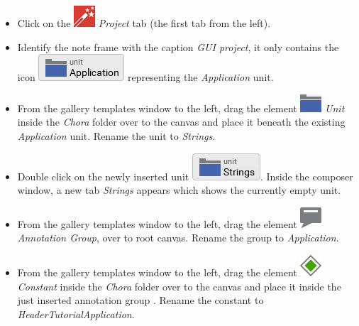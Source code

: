 \documentclass[
  a4paper,
,tablecaptionabove
]{scrbook}
\begin{document}
\begin{itemize}
\item
  Click on the
  \includegraphics{./../asciidoc/modules/ROOT/assets/images/icons/EmbeddedWizardIcon.png}
  \emph{Project} tab (the first tab from the left).
\item
  Identify the note frame with the caption \emph{GUI project}, it only
  contains the icon
  \includegraphics{./../asciidoc/modules/ROOT/assets/images/icons/ApplicationUnitIcon.png}
  representing the \emph{Application} unit.
\item
  From the gallery templates window to the left, drag the element
  \includegraphics{./../asciidoc/modules/ROOT/assets/images/icons/UnitIcon.png}
  \emph{Unit} inside the \emph{Chora} folder over to the canvas and
  place it beneath the existing \emph{Application} unit. Rename the unit
  to \emph{Strings}.
\item
  Double click on the newly inserted unit
  \includegraphics{./../asciidoc/modules/ROOT/assets/images/icons/StringsUnitIcon.png}.
  Inside the composer window, a new tab \emph{Strings} appears which
  shows the currently empty unit.
\item
  From the gallery templates window to the left, drag the element
  \includegraphics{./../asciidoc/modules/ROOT/assets/images/icons/AnnotationGroupIcon.png}
  \emph{Annotation Group}, over to root canvas. Rename the group to
  \emph{Application}.
\item
  From the gallery templates window to the left, drag the element
  \includegraphics{./../asciidoc/modules/ROOT/assets/images/icons/ConstantIcon.png}
  \emph{Constant} inside the \emph{Chora} folder over to the canvas and
  place it inside the just inserted annotation group . Rename the
  constant to \emph{HeaderTutorialApplication}.
\end{itemize}
\end{document}
